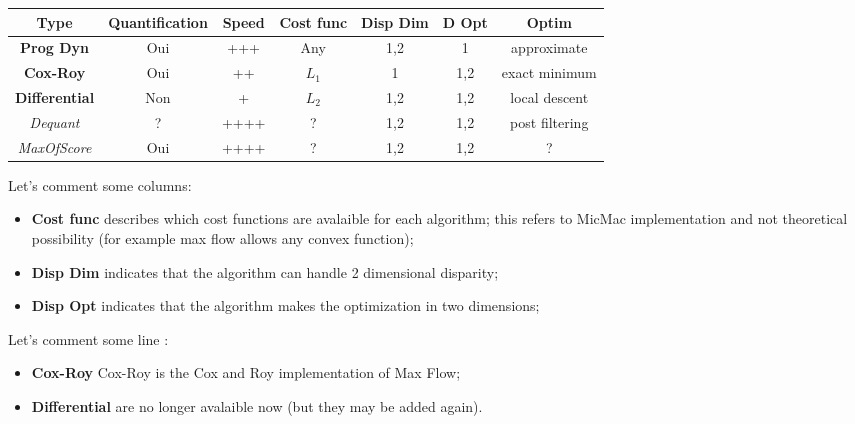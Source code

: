 \begin{tabular} { c | c | c | c| c| c | c} %

 {\bf Type }        &  {Quantification} & {Speed} & {Cost func} &  {Disp Dim} &  {D Opt} & {Optim}\\  \hline \hline
 {\bf Prog Dyn }    &  {Oui} & {+++} &          { Any} & {1,2} & {1} &{approximate}\\  \hline 
 {\bf Cox-Roy }     &  {Oui} & {++} &           {$L_1$} & {1} & {1,2} & {exact minimum}\\  \hline 
 {\bf Differential }&  {Non} & {+} &            {$L_2$} & {1,2} & {1,2} &{local descent} \\  \hline  \hline
 {\it Dequant }     &  {?} & {++++} &           { ?} & {1,2} & {1,2} &{ post filtering}\\  \hline 
 {\it MaxOfScore }  &  {Oui} & {++++} &         { ?} & {1,2} & {1,2} &{  ?} \\  \hline 

\end{tabular}


Let's comment some columns:

\begin{itemize}
  \item {\bf Cost func} describes which cost functions are avalaible for each algorithm;
        this refers to MicMac implementation and not theoretical possibility (for example
        max flow allows any convex function);
       
  \item {\bf Disp  Dim}  indicates that the algorithm can handle 2 dimensional disparity;

  \item {\bf Disp  Opt}  indicates that the algorithm makes the optimization in two dimensions;
        
\end{itemize}


Let's comment some line :

\begin{itemize}
   \item   {\bf   Cox-Roy } Cox-Roy  is the Cox and Roy implementation of Max Flow;
   \item   {\bf   Differential } are no longer avalaible now (but they may be added again).
\end{itemize}


